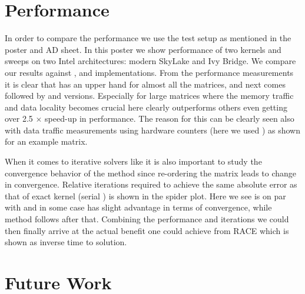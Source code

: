 \section{Performance}
In order to compare the performance we use the test setup as mentioned in the poster and AD sheet. In this poster we show performance of two kernels \SymmSpmv and \KACZ sweeps on two Intel architectures: modern SkyLake and  Ivy Bridge. We compare our results against \ABMC, \MC and \MKL implementations. From the performance measurements  it is clear that \RACE has an upper hand for almost all the matrices, and next comes \ABMC followed by \MKL and \MC versions. Especially for large matrices where the memory traffic and data locality becomes crucial here \RACE clearly outperforms others even getting over 2.5 $\times$ speed-up in performance. The reason for this can be clearly seen also with data traffic measurements using hardware counters (here we used \LIKWID\cite{LIKWID}) as shown for an example matrix.

When it comes to iterative solvers like \KACZ it is also important to study the convergence behavior of the method since re-ordering the matrix leads to change in convergence. Relative iterations required to achieve the same absolute error as that of exact kernel (serial \KACZ) is shown in the spider plot. Here we see \RACE is on par with \ABMC and in some case has slight advantage in terms of convergence, while \MC method follows after that. Combining the performance and iterations we could then finally arrive at the actual benefit one could achieve from RACE which is shown as inverse time to solution.

\section{Future Work}

